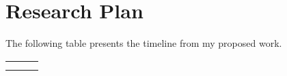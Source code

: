 \section{Research Plan}
\label{sec:plan}

The following table presents the timeline from my proposed work.

\begin{table}[h]
\centering
\begin{tabular}{|l|l|l|}
\hline
 &  &  \\ \hline
 &  &  \\ \hline
 &  & \\ \hline 
\end{tabular}
\end{table}

